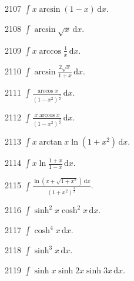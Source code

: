 \begin{prob}[S]{2107}
$\int x \arcsin(1 - x) \,\mathrm{d}x$.
\end{prob}

\begin{prob}[S]{2108}
$\int \arcsin \sqrt{x} \,\mathrm{d}x$.
\end{prob}

\begin{prob}[S]{2109}
$\int x \arccos \frac{1}{x} \,\mathrm{d}x$.
\end{prob}

\begin{prob}[S]{2110}
$\int \arcsin \frac{2\sqrt{x}}{1 + x} \,\mathrm{d}x$.
\end{prob}

\begin{prob}[S]{2111}
$\int \frac{\arccos x}{(1 - x^2)^{\frac{3}{2}}} \,\mathrm{d}x$.
\end{prob}

\begin{prob}[S]{2112}
$\int \frac{x \arccos x}{(1 - x^2)^{\frac{3}{2}}} \,\mathrm{d}x$.
\end{prob}

\begin{prob}[S]{2113}
$\int x \arctan x \ln(1 + x^2) \,\mathrm{d}x$.
\end{prob}

\begin{prob}[S]{2114}
$\int x \ln \frac{1 + x}{1 - x} \,\mathrm{d}x$.
\end{prob}

\begin{prob}[S]{2115}
$\int \frac{\ln(x + \sqrt{1 + x^2}) \,\mathrm{d}x}{(1 + x^2)^{\frac{3}{2}}}$.
\end{prob}


\begin{prob}[S]{2116}
$\int \sinh^2 x \cosh^2 x \,\mathrm{d}x$.
\end{prob}

\begin{prob}[S]{2117}
$\int \cosh^4 x \,\mathrm{d}x$.
\end{prob}

\begin{prob}[S]{2118}
$\int \sinh^3 x \,\mathrm{d}x$.
\end{prob}

\begin{prob}[S]{2119}
$\int \sinh x \sinh 2x \sinh 3x \,\mathrm{d}x$.
\end{prob}

